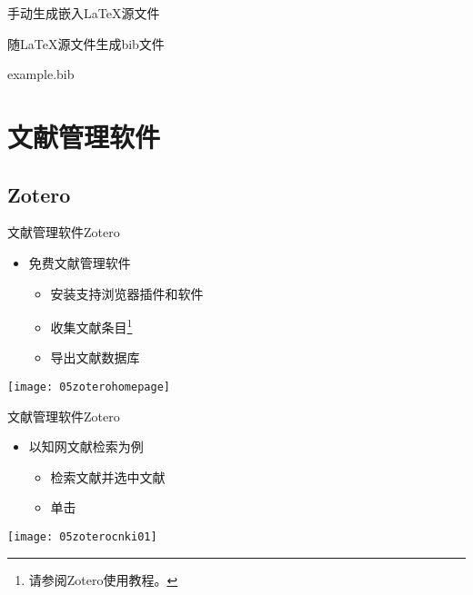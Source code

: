\documentclass[fontset = none, t]{ctexbeamer}
\begin{document}
\begin{frame}[fragile]{手动生成}{嵌入\LaTeX 源文件}
\begin{spacing}{1.3}
\begin{center}
\begin{minipage}[h]{0.55\linewidth}
\begin{textcb}{随\LaTeX 源文件生成bib文件}
\begin{filecontents}{example.bib}
\section[文献管理软件]{文献管理软件}
\subsection[Zotero]{Zotero}
\begin{frame}[fragile]{文献管理软件}{Zotero}
  \begin{spacing}{1.5}
    \begin{itemize}
    \item 免费文献管理软件
      \begin{itemize}
      \item 安装支持浏览器插件和软件
      \item 收集文献条目\footnote[frame,2]{请参阅Zotero使用教程。}
      \item 导出文献数据库
      \end{itemize}
    \end{itemize}    
    \begin{center}
      \texttt{[image: 05zoterohomepage]}
    \end{center}
  \end{spacing}
\end{frame}

\begin{frame}[fragile]{文献管理软件}{Zotero}
  \begin{spacing}{1.2}
    \begin{itemize}
    \item 以\alert{知网}文献检索为例
      \begin{itemize}
      \item 检索文献并选中文献
      \item 单击
      \end{itemize}
    \end{itemize}    
    \begin{center}
      \begin{annotatedFigure}
        {\texttt{[image: 05zoterocnki01]}}
      \end{annotatedFigure}      
    \end{center}
  \end{spacing}
\end{frame}


\end{filecontents}
\end{textcb}
\end{minipage}
\end{center}
\end{spacing}
\end{frame}
\end{document}
